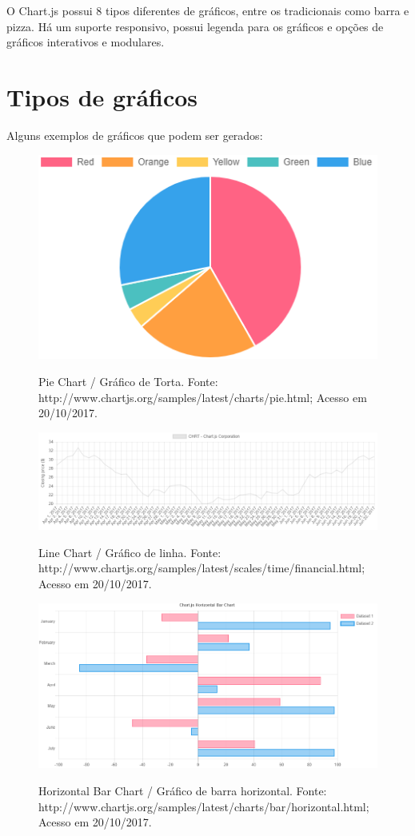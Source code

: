 \documentclass[12pt,a4paper]{article}
\begin{document}
O Chart.js possui 8 tipos diferentes de gráficos, entre os tradicionais como barra e pizza. Há um suporte responsivo, possui legenda para os gráficos e opções de gráficos interativos e modulares.


\section{Tipos de gráficos}
Alguns exemplos de gráficos que podem ser gerados:
\begin{figure}[!htb]
\centering
\includegraphics[width=18cm]{recursos/PieChart.png}
\label{Pie}
\caption{Pie Chart / Gráfico de Torta. Fonte: http://www.chartjs.org/samples/latest/charts/pie.html; Acesso em 20/10/2017.}
\end{figure}

\begin{figure}[!h]
\centering
\includegraphics[width=13cm]{recursos/LineChart.png}
\label{Line}
\caption{Line Chart / Gráfico de linha. Fonte: http://www.chartjs.org/samples/latest/scales/time/financial.html; Acesso em 20/10/2017.}
\end{figure}

\begin{figure}[!h]
\centering
\includegraphics[width=13cm]{recursos/BarChart.png}
\label{Bar}
\caption{Horizontal Bar Chart / Gráfico de barra horizontal. Fonte: http://www.chartjs.org/samples/latest/charts/bar/horizontal.html; Acesso em 20/10/2017.}
\end{figure}
\end{document}
